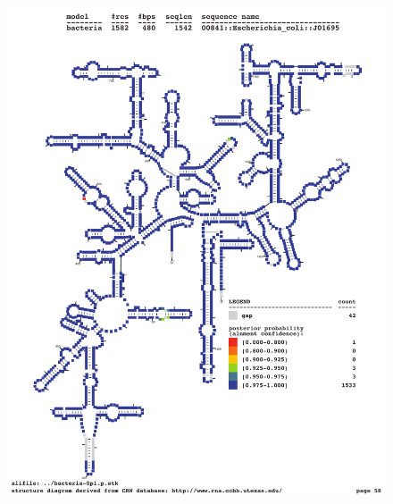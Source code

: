 \newpage

\begin{figure}[h]
\includegraphics[height=8.5in]{Figures/ecoli-prob}
\label{fig:ecoli-prob}
\end{figure}




